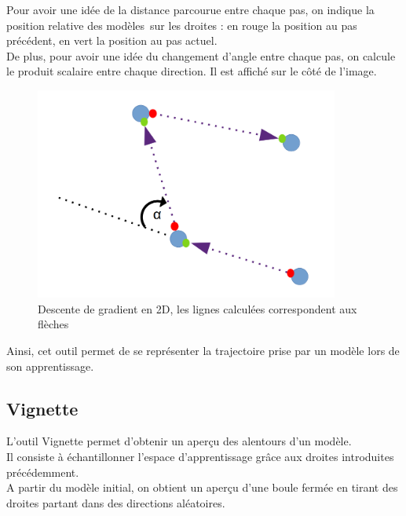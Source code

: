\documentclass[12pt]{article}
\begin{document}
Pour avoir une idée de la distance parcourue entre chaque pas, on indique la position relative des modèles sur les droites : en rouge la position au pas précédent, en vert la position au pas actuel. \\

De plus, pour avoir une idée du changement d'angle entre chaque pas, on calcule le produit scalaire entre chaque direction. Il est affiché sur le côté de l'image. \\

\begin{figure}[htp]
    \centering
    \includegraphics[width=10cm]{Images/gradientStudy_dessus}
    \caption{Descente de gradient en 2D, les lignes calculées correspondent aux flèches}
    \label{fig:gradientStudyAbove}
\end{figure}

Ainsi, cet outil permet de se représenter la trajectoire prise par un modèle lors de son apprentissage. \\

\newpage
\subsection{Vignette}

L’outil Vignette permet d’obtenir un aperçu des alentours d’un modèle. \\

Il consiste à échantillonner l’espace d’apprentissage grâce aux droites introduites précédemment. \\

A partir du modèle initial, on obtient un aperçu d'une boule fermée en tirant des droites partant dans des directions aléatoires. \\
\end{document}
